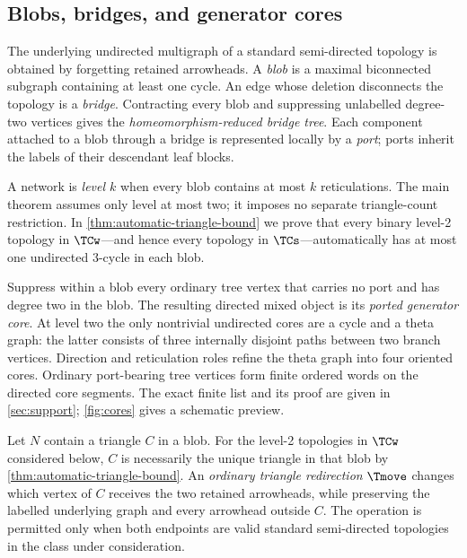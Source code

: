

\subsection{Blobs, bridges, and generator cores}

The underlying undirected multigraph of a standard semi-directed topology is obtained by forgetting retained arrowheads.  A \emph{blob} is a maximal biconnected subgraph containing at least one cycle.  An edge whose deletion disconnects the topology is a \emph{bridge}.  Contracting every blob and suppressing unlabelled degree-two vertices gives the \emph{homeomorphism-reduced bridge tree}.  Each component attached to a blob through a bridge is represented locally by a \emph{port}; ports inherit the labels of their descendant leaf blocks.

A network is \emph{level $k$} when every blob contains at most $k$ reticulations.  The main theorem assumes only level at most two; it imposes no separate triangle-count restriction.  In \cref{thm:automatic-triangle-bound} we prove that every binary level-2 topology in $\TCw$---and hence every topology in $\TCs$---automatically has at most one undirected 3-cycle in each blob.

Suppress within a blob every ordinary tree vertex that carries no port and has degree two in the blob.  The resulting directed mixed object is its \emph{ported generator core}.  At level two the only nontrivial undirected cores are a cycle and a theta graph: the latter consists of three internally disjoint paths between two branch vertices.  Direction and reticulation roles refine the theta graph into four oriented cores.  Ordinary port-bearing tree vertices form finite ordered words on the directed core segments.  The exact finite list and its proof are given in \cref{sec:support}; \cref{fig:cores} gives a schematic preview.

\begin{definition}\label{def:T}
Let $N$ contain a triangle $C$ in a blob.  For the level-2 topologies in $\TCw$ considered below, $C$ is necessarily the unique triangle in that blob by \cref{thm:automatic-triangle-bound}.  An \emph{ordinary triangle redirection} $\Tmove$ changes which vertex of $C$ receives the two retained arrowheads, while preserving the labelled underlying graph and every arrowhead outside $C$.  The operation is permitted only when both endpoints are valid standard semi-directed topologies in the class under consideration.
\end{definition}

